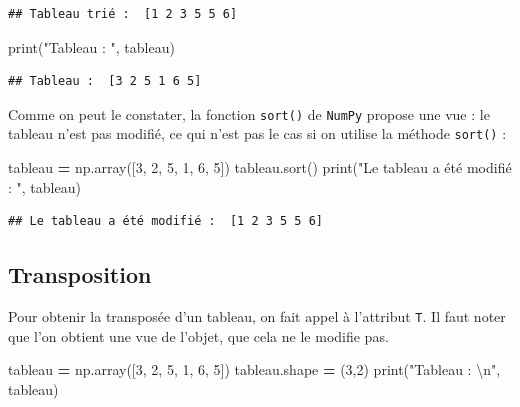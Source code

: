 \documentclass[12pt,]{book}
\newenvironment{Shaded}{\begin{snugshade}}{\end{snugshade}}
\newcommand{\DecValTok}[1]{\textcolor[rgb]{0.00,0.00,0.81}{#1}}
\newcommand{\CharTok}[1]{\textcolor[rgb]{0.31,0.60,0.02}{#1}}
\newcommand{\StringTok}[1]{\textcolor[rgb]{0.31,0.60,0.02}{#1}}
\newcommand{\OperatorTok}[1]{\textcolor[rgb]{0.81,0.36,0.00}{\textbf{#1}}}
\newcommand{\BuiltInTok}[1]{#1}
\newcommand{\NormalTok}[1]{#1}
\numberwithin{equation}{section}
\numberwithin{countremarque}{section}
\begin{document}
\begin{lstlisting}
## Tableau trié :  [1 2 3 5 5 6]
\end{lstlisting}

\begin{Shaded}
\begin{Highlighting}[]
\BuiltInTok{print}\NormalTok{(}\StringTok{"Tableau : "}\NormalTok{, tableau)}
\end{Highlighting}
\end{Shaded}

\begin{lstlisting}
## Tableau :  [3 2 5 1 6 5]
\end{lstlisting}

Comme on peut le constater, la fonction \texttt{sort()} de
\texttt{NumPy} propose une vue : le tableau n'est pas modifié, ce qui
n'est pas le cas si on utilise la méthode \texttt{sort()} :

\begin{Shaded}
\begin{Highlighting}[]
\NormalTok{tableau }\OperatorTok{=}\NormalTok{ np.array([}\DecValTok{3}\NormalTok{, }\DecValTok{2}\NormalTok{, }\DecValTok{5}\NormalTok{, }\DecValTok{1}\NormalTok{, }\DecValTok{6}\NormalTok{, }\DecValTok{5}\NormalTok{])}
\NormalTok{tableau.sort()}
\BuiltInTok{print}\NormalTok{(}\StringTok{"Le tableau a été modifié : "}\NormalTok{, tableau)}
\end{Highlighting}
\end{Shaded}

\begin{lstlisting}
## Le tableau a été modifié :  [1 2 3 5 5 6]
\end{lstlisting}

\subsection{Transposition}\label{transposition-tableau}

Pour obtenir la transposée d'un tableau, on fait appel à l'attribut
\texttt{T}. Il faut noter que l'on obtient une vue de l'objet, que cela
ne le modifie pas.

\begin{Shaded}
\begin{Highlighting}[]
\NormalTok{tableau }\OperatorTok{=}\NormalTok{ np.array([}\DecValTok{3}\NormalTok{, }\DecValTok{2}\NormalTok{, }\DecValTok{5}\NormalTok{, }\DecValTok{1}\NormalTok{, }\DecValTok{6}\NormalTok{, }\DecValTok{5}\NormalTok{])}
\NormalTok{tableau.shape }\OperatorTok{=}\NormalTok{ (}\DecValTok{3}\NormalTok{,}\DecValTok{2}\NormalTok{)}
\BuiltInTok{print}\NormalTok{(}\StringTok{"Tableau : }\CharTok{\textbackslash{}n}\StringTok{"}\NormalTok{, tableau)}
\end{Highlighting}
\end{Shaded}
\end{document}
